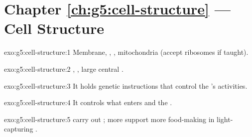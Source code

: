 \section*{Chapter \ref{ch:g5:cell-structure} --- Cell Structure}

\begin{solution}{exo:g5:cell-structure:1}
Membrane, , , mitochondria (accept ribosomes if taught).
\end{solution}

\begin{solution}{exo:g5:cell-structure:2}
, , large central .
\end{solution}

\begin{solution}{exo:g5:cell-structure:3}
It holds genetic instructions that control the 's activities.
\end{solution}

\begin{solution}{exo:g5:cell-structure:4}
It controls what enters and  the .
\end{solution}

\begin{solution}{exo:g5:cell-structure:5}
 carry out ; more  support more
food-making in light-capturing  .
\end{solution}

